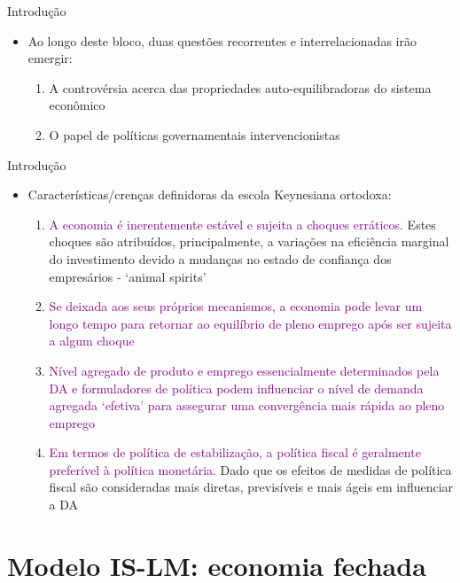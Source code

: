 \documentclass[10pt]{beamer}
\begin{document}
\begin{frame}{Introdução}
    \begin{itemize}
        \item Ao longo deste bloco, duas questões recorrentes e interrelacionadas irão emergir:
        \bigskip
        \begin{enumerate}
            \item A controvérsia acerca das propriedades auto-equilibradoras do sistema econômico
            \medskip
            \item O papel de políticas governamentais intervencionistas
        \end{enumerate}
    \end{itemize}
\end{frame}

\begin{frame}{Introdução}
    \begin{itemize}
        \item Características/crenças definidoras da escola Keynesiana ortodoxa:
        \bigskip
        \begin{enumerate}
            \item \textcolor{purple}{A economia é inerentemente estável e sujeita a choques erráticos}. Estes choques são atribuídos, principalmente, a variações na eficiência marginal do investimento devido a mudanças no estado de confiança dos empresários - `animal spirits'
            \medskip
            \item \textcolor{purple}{Se deixada aos seus próprios mecanismos, a economia pode levar um longo tempo para retornar ao equilíbrio de pleno emprego após ser sujeita a algum choque}
            \medskip
            \item \textcolor{purple}{Nível agregado de produto e emprego essencialmente determinados pela DA e formuladores de política podem influenciar o nível de demanda agregada `efetiva' para assegurar uma convergência mais rápida ao pleno emprego}
            \medskip
            \item \textcolor{purple}{Em termos de política de estabilização, a política fiscal é geralmente preferível à política monetária}. Dado que os efeitos de medidas de política fiscal são consideradas mais diretas, previsíveis e mais ágeis em influenciar a DA
        \end{enumerate}
    \end{itemize}
\end{frame}

\section{Modelo IS-LM: economia fechada}
\end{document}

